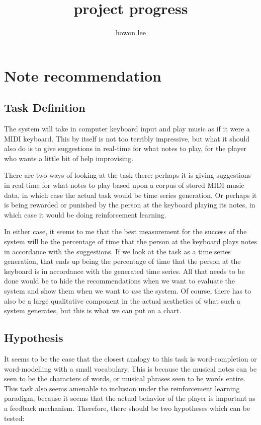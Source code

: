 \documentclass{article}
\begin{document}
\title{project progress}
\author{howon lee}
\maketitle
\section*{Note recommendation}

\subsection*{Task Definition}
The system will take in computer keyboard input and play music as if it were a MIDI keyboard. This by itself is not too terribly impressive, but what it should also do is to give suggestions in real-time for what notes to play, for the player who wants a little bit of help improvising.

There are two ways of looking at the task there: perhaps it is giving suggestions in real-time for what notes to play based upon a corpus of stored MIDI music data, in which case the actual task would be time series generation. Or perhaps it is being rewarded or punished by the person at the keyboard playing its notes, in which case it would be doing reinforcement learning.

In either case, it seems to me that the best measurement for the success of the system will be the percentage of time that the person at the keyboard plays notes in accordance with the suggestions. If we look at the task as a time series generation, that ends up being the percentage of time that the person at the keyboard is in accordance with the generated time series. All that needs to be done would be to hide the recommendations when we want to evaluate the system and show them when we want to \emph{use} the system. Of course, there has to also be a large qualitative component in the actual aesthetics of what such a system generates, but this is what we can put on a chart. 

\subsection*{Hypothesis}
It seems to be the case that the closest analogy to this task is word-completion or word-modelling with a small vocabulary. This is because the musical notes can be seen to be the characters of words, or musical phrases seen to be words entire. This task also seems amenable to inclusion under the reinforcement learning paradigm, because it seems that the actual behavior of the player is important as a feedback mechanism. Therefore, there should be two hypotheses which can be tested:
\end{document}
